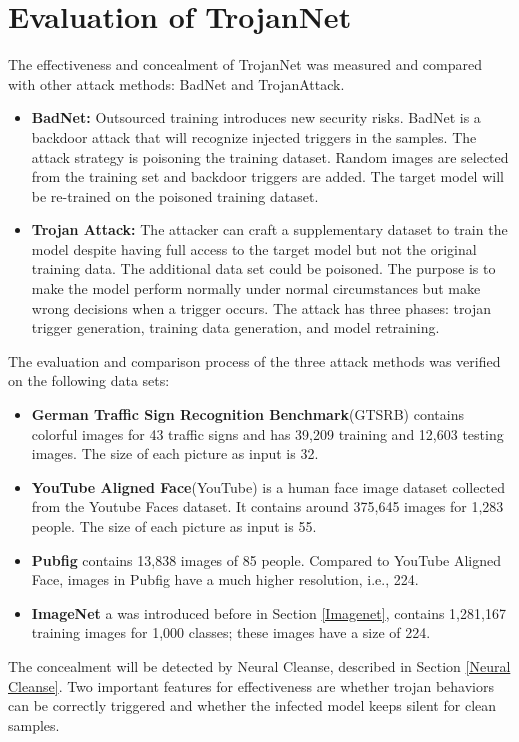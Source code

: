 \documentclass[english,version-2022-01]{uzl-thesis}
\begin{document}
\section{Evaluation of TrojanNet}\label{Evaluation} The effectiveness and concealment of TrojanNet was measured and compared with other attack methods: BadNet and TrojanAttack.
\begin{itemize}
    \item \textbf{BadNet:} Outsourced training introduces new security risks. BadNet is a backdoor attack that will recognize injected triggers in the samples.\cite{gu2019badnets} The attack strategy is poisoning the training dataset. Random images are selected from the training set and backdoor triggers are added. The target model will be re-trained on the poisoned training dataset.
    \item  \textbf{Trojan Attack:} The attacker can craft a supplementary dataset to train the model despite having full access to the target model but not the original training data. The additional data set could be poisoned. The purpose is to make the model perform normally under normal circumstances but make wrong decisions when a trigger occurs. The attack has three phases: trojan trigger generation, training data generation, and model retraining.\cite{liu2018trojaning}\\
\end{itemize}
The evaluation and comparison process of the three attack methods was verified on the following data sets:
\begin{itemize}
    \item \textbf{German Traffic Sign Recognition Benchmark}(GTSRB) contains colorful images for 43 traffic signs and has 39,209 training and 12,603 testing images.\cite{Stallkamp2012} The size of each picture as input is 32.\cite{Stallkamp2012}
    \item \textbf{YouTube Aligned Face}(YouTube) is a human face image dataset collected from the Youtube Faces dataset.\cite{5995566} It contains around 375,645 images for 1,283 people. The size of each picture as input is  55.
    \item \textbf{Pubfig} contains 13,838 images of 85 people.\cite{5459250} Compared to YouTube Aligned Face, images in Pubfig have a much higher resolution, i.e., 224.
    \item \textbf{ImageNet} a was introduced before in Section \ref{Imagenet}, contains 1,281,167 training images for 1,000 classes; these images have a size of 224.
\end{itemize}
The concealment will be detected by Neural Cleanse, described in Section \ref{Neural Cleanse}. Two important features for effectiveness are whether trojan behaviors can be correctly triggered and whether the infected model keeps silent for clean samples.
\end{document}
